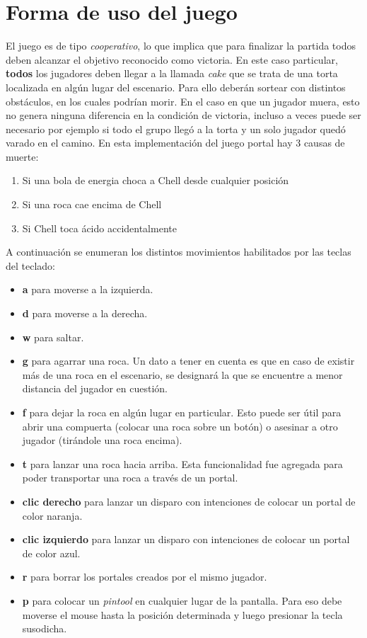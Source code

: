 \documentclass[a4paper]{article}
\begin{document}
\section{Forma de uso del juego}
El juego es de tipo \textit{cooperativo}, lo que implica que para finalizar la partida todos deben alcanzar el objetivo reconocido como victoria. En este caso particular, \textbf{todos} los jugadores deben llegar a la llamada \textit{cake} que se trata de una torta localizada en algún lugar del escenario. Para ello deberán sortear con distintos obstáculos, en los cuales podrían morir. En el caso en que un jugador muera, esto no genera ninguna diferencia en la condición de victoria, incluso a veces puede ser necesario por ejemplo si todo el grupo llegó a la torta y un solo jugador quedó varado en el camino. En esta implementación del juego portal hay 3 causas de muerte:
\begin{enumerate}
	\item Si una bola de energia choca a Chell desde cualquier posición
	\item Si una roca cae encima de Chell
	\item Si Chell toca ácido accidentalmente
\end{enumerate}

A continuación se enumeran los distintos movimientos habilitados por las teclas del teclado:
\begin{itemize}
	\item \textbf{a} para moverse a la izquierda.
	\item \textbf{d} para moverse a la derecha.
	\item \textbf{w} para saltar.
	\item \textbf{g} para agarrar una roca. Un dato a tener en cuenta es que en caso de existir más de una roca en el escenario, se designará la que se encuentre a menor distancia del jugador en cuestión.
	\item \textbf{f} para dejar la roca en algún lugar en particular. Esto puede ser útil para abrir una compuerta (colocar una roca sobre un botón) o asesinar a otro jugador (tirándole una roca encima).
	\item \textbf{t} para lanzar una roca hacia arriba. Esta funcionalidad fue agregada para poder transportar una roca a través de un portal.
	\item \textbf{clic derecho} para lanzar un disparo con intenciones de colocar un portal de color naranja. 
	\item \textbf{clic izquierdo} para lanzar un disparo con intenciones de colocar un portal de color azul. 
	\item \textbf{r} para borrar los portales creados por el mismo jugador.
	\item \textbf{p} para colocar un \textit{pintool} en cualquier lugar de la pantalla. Para eso debe moverse el mouse hasta la posición determinada y luego presionar la tecla susodicha.
\end{itemize}
\end{document}
